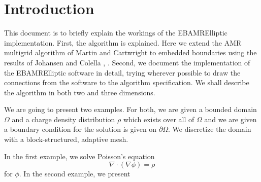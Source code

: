 \section{Introduction}

This document is to briefly explain the workings of the EBAMRElliptic
implementation.  First, the algorithm is explained.  Here we extend the
AMR multigrid algorithm of Martin and  Cartwright \cite{MARTCART} to
embedded boundaries using the results of Johansen and Colella
\cite{JohansenColella1998}, \cite{HANKTHESIS}.
Second, we document the implementation of the EBAMRElliptic software in
detail, trying wherever possible to draw the connections from the
software to the algorithm specification.  We shall describe the 
algorithm in both two and three dimensions.

We are going to present two examples.
For both, we are given a bounded domain $\Omega$ and a charge density distribution
$\rho$ which exists over all of $\Omega$ and we are given a
 boundary condition for the solution is given on $\partial \Omega$.
 We discretize the domain with a block-structured, adaptive mesh.

In the first example,
we solve Poisson's equation 
\begin{equation}
\nabla \cdot (\nabla \phi) = \rho
\label{FISHY}
\end{equation}
for $\phi$.  In the second example, we present
